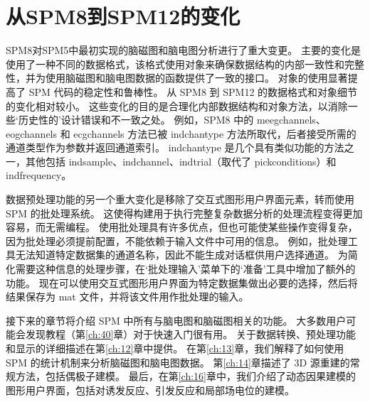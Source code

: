 \section{从SPM8到SPM12的变化}

SPM8对SPM5中最初实现的脑磁图和脑电图分析进行了重大变更。
主要的变化是使用了一种不同的数据格式，该格式使用对象来确保数据结构的内部一致性和完整性，并为使用脑磁图和脑电图数据的函数提供了一致的接口。
对象的使用显著提高了 SPM 代码的稳定性和鲁棒性。
从 SPM8 到 SPM12 的数据格式和对象细节的变化相对较小。
这些变化的目的是合理化内部数据结构和对象方法，以消除一些‘历史性的’设计错误和不一致之处。
例如，SPM8 中的 meegchannels、eogchannels 和 ecgchannels 方法已被 indchantype 方法所取代，后者接受所需的通道类型作为参数并返回通道索引。
indchantype 是几个具有类似功能的方法之一，其他包括 indsample、indchannel、indtrial（取代了 pickconditions）和 indfrequency。

数据预处理功能的另一个重大变化是移除了交互式图形用户界面元素，转而使用 SPM 的批处理系统。
这使得构建用于执行完整复杂数据分析的处理流程变得更加容易，而无需编程。
使用批处理具有许多优点，但也可能使某些操作变得复杂，因为批处理必须提前配置，不能依赖于输入文件中可用的信息。
例如，批处理工具无法知道特定数据集的通道名称，因此不能生成对话框供用户选择通道。
为简化需要这种信息的处理步骤，在‘批处理输入’菜单下的‘准备’工具中增加了额外的功能。
现在可以使用交互式图形用户界面为特定数据集做出必要的选择，然后将结果保存为 mat 文件，并将该文件用作批处理的输入。

接下来的章节将介绍 SPM 中所有与脑电图和脑磁图相关的功能。
大多数用户可能会发现教程（第\ref{ch:40}章）对于快速入门很有用。
关于数据转换、预处理功能和显示的详细描述在第\ref{ch:12}章中提供。
在第\ref{ch:13}章，我们解释了如何使用 SPM 的统计机制来分析脑磁图和脑电图数据。
第\ref{ch:14}章描述了 3D 源重建的常规方法，包括偶极子建模。
最后，在第\ref{ch:16}章中，我们介绍了动态因果建模的图形用户界面，包括对诱发反应、引发反应和局部场电位的建模。
